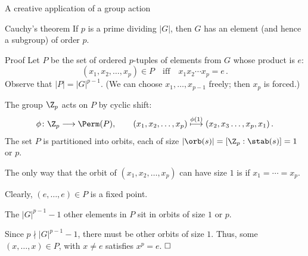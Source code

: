 \documentclass[8pt, handout]{beamer}
\newcommand{\Pause}{}      %
\begin{document}
\begin{frame}{A creative application of a group action}

  \begin{block}{Cauchy's theorem} 
    If $p$ is a prime dividing $|G|$, then $G$ has an element (and
    hence a subgroup) of order $p$.
  \end{block}
  
  \begin{exampleblock}{Proof} \Pause
    Let $P$ be the set of ordered $p$-tuples of
    elements from $G$ whose product is $e$: \vspace{-1mm}
    \[
    (x_1,x_2,\dots,x_p)\in P\quad\mbox{iff}\quad x_1x_2\cdots
    x_p=e\,. \Pause
    \]
    Observe that $|P|=|G|^{p-1}$. (We can choose
    $x_1,\dots,x_{p-1}$ freely; then $x_p$ is forced.)
    
    \pause\medskip 
    
    The group $\Z_p$ acts on $P$ by cyclic shift: \vspace{-2
      mm}
    \[
    \phi\colon\Z_p\longrightarrow\Perm(P),\qquad
    (x_1,x_2,\dots,x_p)\stackrel{\phi(1)}{\longmapsto}
    (x_2,x_3\dots,x_p,x_1)\,. %
    \]
    \Pause The set $P$ is partitioned into orbits, each of size
    $|\orb(s)|=[\Z_p:\stab(s)]=1$ or $p$.
        
    \pause\medskip
    
    The only way that the orbit of $(x_1,x_2,\dots,x_p)$
    can have size $1$ is if $x_1=\cdots=x_p$.

    \Pause\medskip

    Clearly, $(e,\dots,e)\in P$ is a fixed point.
    
    \Pause\medskip
    
    The $|G|^{p-1}-1$ other elements in $P$ sit in orbits of size $1$
    or $p$.
    
    \pause\medskip
    
    Since $p\nmid |G|^{p-1}-1$, there must be other orbits of size
    $1$. \Pause Thus, some $(x,\dots,x)\in P$, with $x\neq e$ satisfies
    $x^p=e$. $\hfill\Box$
  \end{exampleblock}
  
\end{frame}

\end{document}
